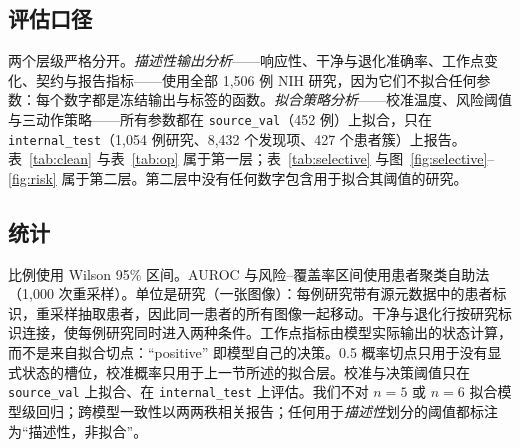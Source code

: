 \subsection{评估口径}

两个层级严格分开。\emph{描述性输出分析}——响应性、干净与退化准确率、工作点变化、契约与报告指标——使用全部 1,506 例 NIH 研究，因为它们不拟合任何参数：每个数字都是冻结输出与标签的函数。\emph{拟合策略分析}——校准温度、风险阈值与三动作策略——所有参数都在 \texttt{source\_val}（452 例）上拟合，只在 \texttt{internal\_test}（1,054 例研究、8,432 个发现项、427 个患者簇）上报告。表~\ref{tab:clean} 与表~\ref{tab:op} 属于第一层；表~\ref{tab:selective} 与图~\ref{fig:selective}--\ref{fig:risk} 属于第二层。第二层中没有任何数字包含用于拟合其阈值的研究。

\subsection{统计}

比例使用 Wilson 95\% 区间。AUROC 与风险--覆盖率区间使用患者聚类自助法（1,000 次重采样）。单位是研究（一张图像）：每例研究带有源元数据中的患者标识，重采样抽取患者，因此同一患者的所有图像一起移动。干净与退化行按研究标识连接，使每例研究同时进入两种条件。工作点指标由模型实际输出的状态计算，而不是来自拟合切点：``positive'' 即模型自己的决策。0.5 概率切点只用于没有显式状态的槽位，校准概率只用于上一节所述的拟合层。校准与决策阈值只在 \texttt{source\_val} 上拟合、在 \texttt{internal\_test} 上评估。我们不对 $n=5$ 或 $n=6$ 拟合模型级回归；跨模型一致性以两两秩相关报告；任何用于\emph{描述性}划分的阈值都标注为``描述性，非拟合''。
